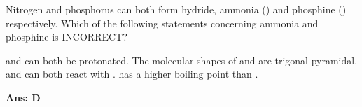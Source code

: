 \documentclass[border=3pt,varwidth=72mm]{standalone}
\begin{document}
 
Nitrogen and phosphorus can both form hydride, ammonia () and phosphine () respectively. Which of the following statements concerning ammonia and phosphine is INCORRECT?

\begin{choices}
\choice {} and  can both be protonated.
\choice The molecular shapes of  and  are trigonal pyramidal.
\choice {} and  can both react with .
\choice {} has a higher boiling point than .
\end{choices}

\begin{answer}
\hrulefill\par
\textbf{Ans: D}

\end{answer}
\end{document}
